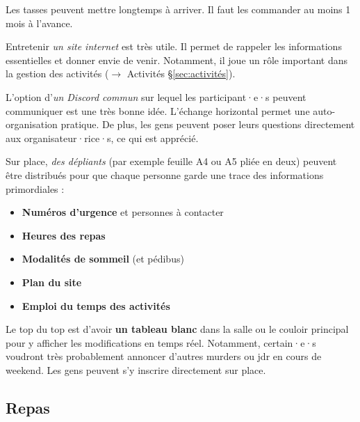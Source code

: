 \begin{Attention}{}{}
Les tasses peuvent mettre longtemps à arriver. Il faut les commander au moins 1 mois à l'avance.
\end{Attention}

Entretenir \emph{un site internet} est très utile. Il permet de rappeler les informations essentielles et donner envie de venir. Notamment, il joue un rôle important dans la gestion des activités ($\to$ Activités \S\ref{sec:activités}).

L'option d'\emph{un Discord commun} sur lequel les participant·e·s peuvent communiquer est une très bonne idée. L'échange horizontal permet une auto-organisation pratique. De plus, les gens peuvent poser leurs questions directement aux organisateur·rice·s, ce qui est apprécié.

Sur place, \emph{des dépliants} (par exemple feuille A4 ou A5 pliée en deux) peuvent être distribués pour que chaque personne garde une trace des informations primordiales :
\begin{itemize}
    \item \textbf{Numéros d'urgence} et personnes à contacter
    \item \textbf{Heures des repas}
    \item \textbf{Modalités de sommeil} (et pédibus)
    \item \textbf{Plan du site}
    \item \textbf{Emploi du temps des activités}
\end{itemize}

Le top du top est d'avoir \textbf{un tableau blanc} dans la salle ou le couloir principal pour y afficher les modifications en temps réel. Notamment, certain·e·s voudront très probablement annoncer d'autres murders ou jdr en cours de weekend. Les gens peuvent s'y inscrire directement sur place.

\subsection{Repas}\label{sec:repas}

